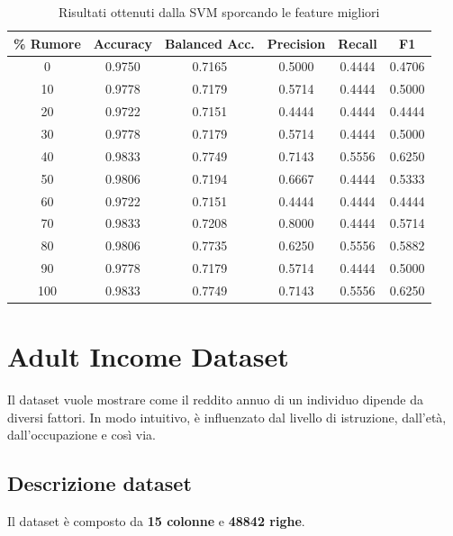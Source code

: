 \documentclass{article}
\begin{document}
\begin{table}[H]
\centering
\label{tab:rumore_risultati_4}
\begin{tabular}{cccccc}
\hline
\textbf{\% Rumore} & \textbf{Accuracy} & \textbf{Balanced Acc.} & \textbf{Precision} & \textbf{Recall} & \textbf{F1} \\
\hline
0   & 0.9750 & 0.7165 & 0.5000 & 0.4444 & 0.4706 \\
10  & 0.9778 & 0.7179 & 0.5714 & 0.4444 & 0.5000 \\
20  & 0.9722 & 0.7151 & 0.4444 & 0.4444 & 0.4444 \\
30  & 0.9778 & 0.7179 & 0.5714 & 0.4444 & 0.5000 \\
40  & 0.9833 & 0.7749 & 0.7143 & 0.5556 & 0.6250 \\
50  & 0.9806 & 0.7194 & 0.6667 & 0.4444 & 0.5333 \\
60  & 0.9722 & 0.7151 & 0.4444 & 0.4444 & 0.4444 \\
70  & 0.9833 & 0.7208 & 0.8000 & 0.4444 & 0.5714 \\
80  & 0.9806 & 0.7735 & 0.6250 & 0.5556 & 0.5882 \\
90  & 0.9778 & 0.7179 & 0.5714 & 0.4444 & 0.5000 \\
100 & 0.9833 & 0.7749 & 0.7143 & 0.5556 & 0.6250 \\
\hline
\end{tabular}
\caption{Risultati ottenuti dalla SVM sporcando le feature migliori}
\end{table}


\newpage
\section{Adult Income Dataset}

Il dataset vuole mostrare come il reddito annuo di un individuo dipende da diversi fattori. In modo intuitivo, è influenzato dal livello di istruzione, dall’età, dall’occupazione e così via.

\subsection{Descrizione dataset}
Il dataset è composto da \textbf{15 colonne} e \textbf{48842 righe}.
\end{document}
